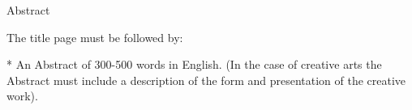 Abstract

The title page must be followed by:

    * An Abstract of 300-500 words in English. (In the case of creative arts the Abstract must include a description of the form and presentation of the creative work).